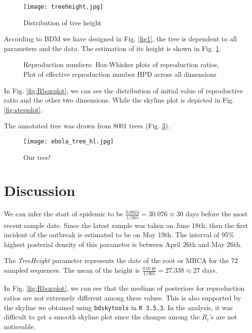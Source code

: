 \documentclass[11pt]{paper}
\begin{document}
	\begin{figure}[!htbp]
		\label{fig:treeheight}
		\centering
		\texttt{[image: treeheight.jpg]}
		\caption{Distribution of tree height}
	\end{figure}

	According to BDM we have designed in Fig. \ref{fig1}, the tree is dependent to all parameters and the data. 
	The estimation of its height is shown in Fig. \ref{fig:treeheight}. 
	
	\begin{figure}[!htbp]%
		\centering
		\hspace{6pt}%
		\caption[Ri]{Reproduction numbers:
			 Box-Whisker plots of reproduction ratios,
			 Plot of effective reproduction number HPD across all dimensions}
		\label{fig:Ri}%
	\end{figure}


	In Fig. \ref{fig:Rboxplot}, we can see the distribution of initial value of reproductive ratio and the other two dimensions.
	While the skyline plot is depicted in Fig. \ref{fig:stepplot}.

	The annotated tree was drawn from 8001 trees (Fig. \ref{fig:tree}). 
	\begin{figure}[!htbp]
		\label{fig:tree}
		\centering
		\texttt{[image: ebola\_tree\_hl.jpg]}
		\caption{Our tree!}
	\end{figure}
	
\section*{Discussion}
	We can infer the start of epidemic to be $\tfrac{0.0824}{1/365} = 30.076 \approx 30$ days before the most recent sample date.
	Since the latest sample was taken on June 18th, then the first incident of the outbreak is estimated to be on May 19th. 
	The interval of 95\% highest posterial density of this parameter is between April 26th and May 26th. 
	
	The \textit{TreeHeight} parameter represents the date of the root or MRCA for the 72 sampled sequences. 
	The mean of the height is $\tfrac{0.0749}{1/365} = 27.338 \approx 27$ days.
	
	In Fig. \ref{fig:Rboxplot}, we can see that the medians of posteriors for reproduction ratios are not extremely different among three values. 
	This is also supported by the skyline we obtained using \texttt{bdskytools} in \texttt{R 3.5.3}. 
	In the analysis, it was difficult to get a smooth skyline plot since the changes among the $R_i$'s are not noticeable.
	
\end{document}
